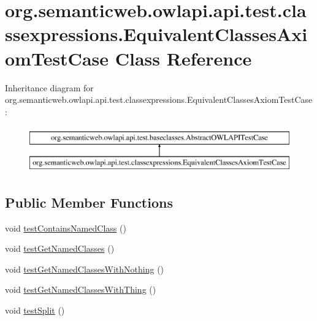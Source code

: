 \hypertarget{classorg_1_1semanticweb_1_1owlapi_1_1api_1_1test_1_1classexpressions_1_1_equivalent_classes_axiom_test_case}{\section{org.\-semanticweb.\-owlapi.\-api.\-test.\-classexpressions.\-Equivalent\-Classes\-Axiom\-Test\-Case Class Reference}
\label{classorg_1_1semanticweb_1_1owlapi_1_1api_1_1test_1_1classexpressions_1_1_equivalent_classes_axiom_test_case}
}
Inheritance diagram for org.\-semanticweb.\-owlapi.\-api.\-test.\-classexpressions.\-Equivalent\-Classes\-Axiom\-Test\-Case\-:\begin{figure}[H]
\begin{center}
\leavevmode
\includegraphics[height=2.000000cm]{classorg_1_1semanticweb_1_1owlapi_1_1api_1_1test_1_1classexpressions_1_1_equivalent_classes_axiom_test_case}
\end{center}
\end{figure}
\subsection*{Public Member Functions}
\begin{DoxyCompactItemize}
\item 
void \hyperlink{classorg_1_1semanticweb_1_1owlapi_1_1api_1_1test_1_1classexpressions_1_1_equivalent_classes_axiom_test_case_a262e4586b231fd5d76ef28e65bdb1b09}{test\-Contains\-Named\-Class} ()
\item 
void \hyperlink{classorg_1_1semanticweb_1_1owlapi_1_1api_1_1test_1_1classexpressions_1_1_equivalent_classes_axiom_test_case_a730ee0a2034b160155c0e5eb257f121c}{test\-Get\-Named\-Classes} ()
\item 
void \hyperlink{classorg_1_1semanticweb_1_1owlapi_1_1api_1_1test_1_1classexpressions_1_1_equivalent_classes_axiom_test_case_ab6f4ef872f337e0f37a32a54596da006}{test\-Get\-Named\-Classes\-With\-Nothing} ()
\item 
void \hyperlink{classorg_1_1semanticweb_1_1owlapi_1_1api_1_1test_1_1classexpressions_1_1_equivalent_classes_axiom_test_case_a580666068f03b37565921fe1209ef075}{test\-Get\-Named\-Classes\-With\-Thing} ()
\item 
void \hyperlink{classorg_1_1semanticweb_1_1owlapi_1_1api_1_1test_1_1classexpressions_1_1_equivalent_classes_axiom_test_case_a917283460d3b871e3f3e3fedbdcefb2d}{test\-Split} ()
\end{DoxyCompactItemize}

